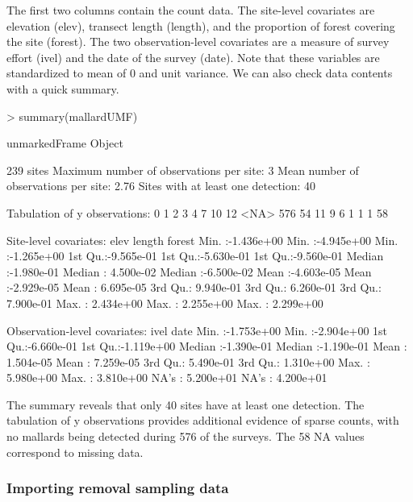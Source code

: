 \documentclass[article,shortnames]{jss}
\begin{document}
{The first two columns contain the count data. The site-level covariates are 
elevation (elev), transect length (length), 
and the proportion of forest covering the site (forest).  The two 
observation-level covariates are a measure of survey effort (ivel) and the date 
of the survey (date).  Note that these variables are standardized to 
mean of 0 and unit variance.  We can also check data contents with a 
quick summary.

\begin{Schunk}
\begin{Sinput}
> summary(mallardUMF)
\end{Sinput}
\begin{Soutput}
unmarkedFrame Object

239 sites
Maximum number of observations per site: 3 
Mean number of observations per site: 2.76 
Sites with at least one detection: 40 

Tabulation of y observations:
   0    1    2    3    4    7   10   12 <NA> 
 576   54   11    9    6    1    1    1   58 

Site-level covariates:
      elev                length               forest          
 Min.   :-1.436e+00   Min.   :-4.945e+00   Min.   :-1.265e+00  
 1st Qu.:-9.565e-01   1st Qu.:-5.630e-01   1st Qu.:-9.560e-01  
 Median :-1.980e-01   Median : 4.500e-02   Median :-6.500e-02  
 Mean   :-4.603e-05   Mean   :-2.929e-05   Mean   : 6.695e-05  
 3rd Qu.: 9.940e-01   3rd Qu.: 6.260e-01   3rd Qu.: 7.900e-01  
 Max.   : 2.434e+00   Max.   : 2.255e+00   Max.   : 2.299e+00  

Observation-level covariates:
      ivel                 date           
 Min.   :-1.753e+00   Min.   :-2.904e+00  
 1st Qu.:-6.660e-01   1st Qu.:-1.119e+00  
 Median :-1.390e-01   Median :-1.190e-01  
 Mean   : 1.504e-05   Mean   : 7.259e-05  
 3rd Qu.: 5.490e-01   3rd Qu.: 1.310e+00  
 Max.   : 5.980e+00   Max.   : 3.810e+00  
 NA's   : 5.200e+01   NA's   : 4.200e+01  
\end{Soutput}
\end{Schunk}

The summary reveals that only 40 sites have at least one detection. The 
tabulation of y observations provides additional evidence of sparse counts, 
with no mallards being detected during 576 of the surveys. The 58 NA values 
correspond to missing data. 


\subsubsection{Importing removal sampling data}

}
\end{document}
